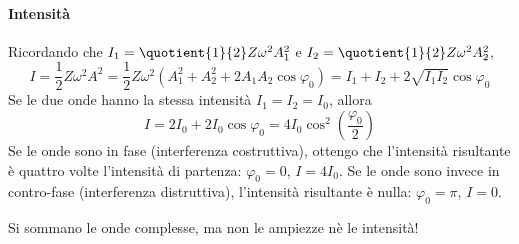 \paragraph{Intensità}
Ricordando che \(I_1 = \quotient{1}{2} Z \omega ^{2} A_1 ^{2} \) e \(I_2 = \quotient{1}{2} Z \omega ^{2} A_2 ^{2} \),
\[
	I = \frac{1}{2} Z \omega ^{2} A^{2} = \frac{1}{2} Z \omega ^{2} (A_1 ^{2} + A_2 ^{2} + 2 A_1 A_2 \cos \varphi _0 ) = I_1 + I_2 + 2 \sqrt{I_1 I_2} \cos \varphi _0
\]
Se le due onde hanno la stessa intensità \(I_1 = I_2 = I_0 \), allora 
\[
	I = 2 I_0 + 2 I_0 \cos \varphi _0 = 4 I_0 \cos ^{2} \left( \frac{\varphi _0}{2} \right)
\]
Se le onde sono in fase (interferenza costruttiva), ottengo che l'intensità risultante è quattro volte l'intensità di partenza: \(\varphi _0 = 0\), \(I= 4 I_0\). Se le onde sono invece in contro-fase (interferenza distruttiva), l'intensità risultante è nulla: \(\varphi _0 = \pi \), \(I = 0\).
\begin{note}
	Si sommano le onde complesse, ma non le ampiezze nè le intensità!
\end{note}

